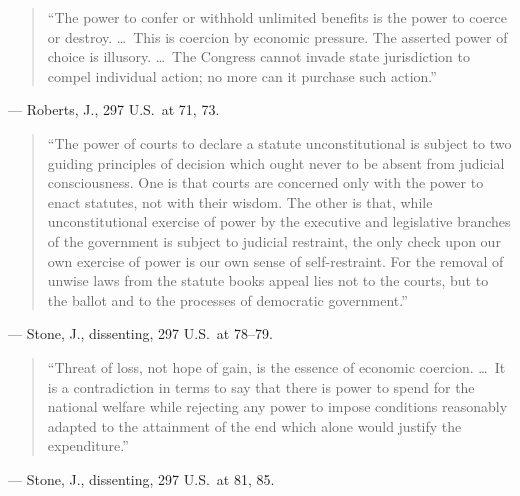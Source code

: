 \documentclass[12pt]{article}
\begin{document}
\begin{quote}
``The power to confer or withhold unlimited benefits is the power to coerce or destroy. \dots\ This is coercion by economic pressure. The asserted power of choice is illusory. \dots\ The Congress cannot invade state jurisdiction to compel individual action; no more can it purchase such action.''
\end{quote}
\noindent --- Roberts, J., 297 U.S.\ at 71, 73.

\begin{quote}
``The power of courts to declare a statute unconstitutional is subject to two guiding principles of decision which ought never to be absent from judicial consciousness. One is that courts are concerned only with the power to enact statutes, not with their wisdom. The other is that, while unconstitutional exercise of power by the executive and legislative branches of the government is subject to judicial restraint, the only check upon our own exercise of power is our own sense of self-restraint. For the removal of unwise laws from the statute books appeal lies not to the courts, but to the ballot and to the processes of democratic government.''
\end{quote}
\noindent --- Stone, J., dissenting, 297 U.S.\ at 78--79.

\begin{quote}
``Threat of loss, not hope of gain, is the essence of economic coercion. \dots\ It is a contradiction in terms to say that there is power to spend for the national welfare while rejecting any power to impose conditions reasonably adapted to the attainment of the end which alone would justify the expenditure.''
\end{quote}
\noindent --- Stone, J., dissenting, 297 U.S.\ at 81, 85.
\end{document}
